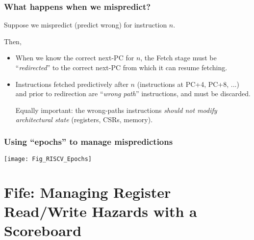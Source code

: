 
\begin{frame}[fragile]
\frametitle{What happens when we mispredict?}

\footnotesize

Suppose we mispredict (predict wrong) for instruction $n$.

\vspace{2ex}

Then,

\vspace{2ex}

\begin{itemize}

 \item When we know the correct next-PC for $n$, the Fetch stage must
       be ``\emph{redirected}'' to the correct next-PC from which it
       can resume fetching.

 \item Instructions fetched predictively after $n$ (instructions at
       PC+4, PC+8, ...) and prior to redirection are ``\emph{wrong
       path}'' instructions, and must be discarded.

       \vspace{2ex}

       Equally important: the wrong-paths instructions \emph{should
       not modify architectural state} (registers, CSRs, memory).

\end{itemize}

\end{frame}


\begin{frame}[fragile]
\frametitle{Using ``epochs'' to manage mispredictions}

\footnotesize

\begin{center}
 \texttt{[image: Fig\_RISCV\_Epochs]}
\end{center}

\end{frame}


\section{Fife: Managing Register Read/Write Hazards with a Scoreboard}

